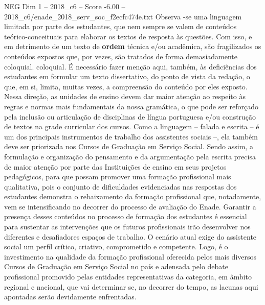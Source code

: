 \begin{textsample}{NEG Dim 1 – 2018\_c6 – Score -6.00 – 2018\_c6/enade\_2018\_serv\_soc\_f2ecfc474e.txt}
Observa -se uma linguagem limitada por parte dos estudantes, que nem sempre se valem de conteúdos teórico-conceituais para elaborar os textos de resposta às questões.
Com isso, e em detrimento de um texto de \textbf{ordem} técnica e/ou acadêmica, são fragilizados os conteúdos expostos que, por vezes, são tratados de forma demasiadamente coloquial. coloquial.
É necessário fazer menção aqui, também, às deficiências dos estudantes em formular um texto dissertativo, do ponto de vista da redação, o que, em si, limita, muitas vezes, a compreensão do conteúdo por eles exposto.
Nessa direção, as unidades de ensino devem dar maior atenção ao respeito às regras e normas mais fundamentais da nossa gramática, o que pode ser reforçado pela inclusão ou articulação de disciplinas de língua portuguesa e/ou construção de textos na grade curricular dos cursos.
Como a linguagem – falada e escrita – é um dos principais instrumentos de trabalho dos assistentes sociais –, ela também deve ser priorizada nos Cursos de Graduação em Serviço Social.
Sendo assim, a formulação e organização do pensamento e da argumentação pela escrita precisa de maior atenção por parte das Instituições de ensino em seus projetos pedagógicos, para que possam promover uma formação profissional mais qualitativa, pois o conjunto de dificuldades evidenciadas nas respostas dos estudantes demonstra o rebaixamento da formação profissional que, notadamente, vem se intensificando no decorrer do processo de avaliação do Enade.
Garantir a presença desses conteúdos no processo de formação dos estudantes é essencial para sustentar as intervenções que os futuros profissionais irão desenvolver nos diferentes e desafiadores espaços de trabalho.
O cenário atual exige do assistente social um perfil crítico, criativo, comprometido e competente.
Logo, é o investimento na qualidade da formação profissional oferecida pelos mais diversos Cursos de Graduação em Serviço Social no país e adensada pelo debate profissional promovido pelas entidades representativas da categoria, em âmbito regional e nacional, que vai determinar se, no decorrer do tempo, as lacunas aqui apontadas serão devidamente enfrentadas.

\end{textsample}
